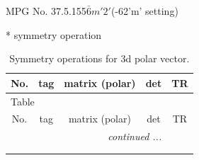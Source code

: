 \documentclass[fleqn,8pt]{jsarticle}
\begin{document}
\setcounter{MaxMatrixCols}{32}

\renewcommand{\tablename}{Table~}
\renewcommand{\figurename}{Figure~}
\begin{center}
\LARGE
MPG No. 37.5.155\quad$\bar{6}m'2'$\quad(-62'm' setting)
\end{center}
* symmetry operation
\renewcommand{\arraystretch}{1.3}
\begin{longtable}{ccccc}
\caption{Symmetry operations for 3d polar vector.}
 \\
 \hline \hline
No. & tag & matrix (polar) & det & TR \\ \hline \endfirsthead

\multicolumn{4}{l}{\tablename\ \thetable{}} \\
 \hline \hline
No. & tag & matrix (polar) & det & TR \\ \hline \endhead

 \hline \hline
\multicolumn{4}{r}{\footnotesize\it continued ...} \\ \endfoot

 \hline \hline
\multicolumn{4}{r}{} \\ \endlastfoot


\end{longtable}
\end{document}
